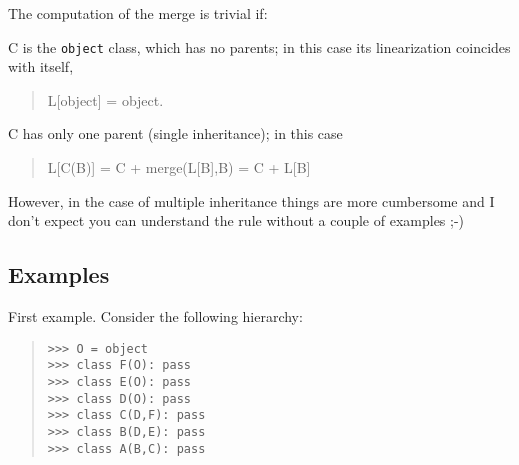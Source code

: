 \documentclass[10pt,english]{article}
\begin{document}
The computation of the merge is trivial if:
\begin{list}{.}
{
\setlength{\rightmargin}{\leftmargin}
}
\item {} 
C is the \texttt{object} class, which has no parents; in this case its
linearization coincides with itself,
\begin{quote}

L[object] = object.
\end{quote}

\item {} 
C has only one parent (single inheritance); in this case
\begin{quote}

L[C(B)] = C + merge(L[B],B) = C + L[B]
\end{quote}

\end{list}

However, in the case of multiple inheritance things are more cumbersome
and I don't expect you can understand the rule without a couple of
examples ;-)



\hypertarget{examples}{}
\subsection*{Examples}

First example. Consider the following hierarchy:
\begin{quote}
\begin{verbatim}>>> O = object
>>> class F(O): pass
>>> class E(O): pass
>>> class D(O): pass
>>> class C(D,F): pass
>>> class B(D,E): pass
>>> class A(B,C): pass\end{verbatim}
\end{quote}
\end{document}
